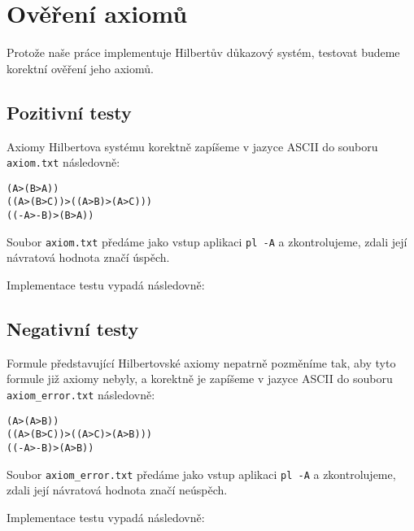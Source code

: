 \documentclass[thesis=B,czech,hidelinks]{FITthesis}[2012/06/26]
\begin{document}
\section{Ověření axiomů}

Protože naše práce implementuje Hilbertův důkazový systém, testovat budeme korektní ověření jeho axiomů.

\subsection{Pozitivní testy}

Axiomy Hilbertova systému korektně zapíšeme v jazyce ASCII do souboru \texttt{axiom.txt} následovně:

\begin{verbatim}
(A>(B>A))
((A>(B>C))>((A>B)>(A>C)))
((-A>-B)>(B>A))
\end{verbatim}

Soubor \texttt{axiom.txt} předáme jako vstup aplikaci \texttt{pl -A} a zkontrolujeme, zdali její návratová hodnota značí úspěch.

Implementace testu vypadá následovně:

\begin{figure}
\centering

\end{figure}

\subsection{Negativní testy}

Formule představující Hilbertovské axiomy nepatrně pozměníme tak, aby tyto formule již axiomy nebyly, a korektně je zapíšeme v jazyce ASCII do souboru \texttt{axiom\_error.txt} následovně:

\begin{verbatim}
(A>(A>B))
((A>(B>C))>((A>C)>(A>B)))
((-A>-B)>(A>B))
\end{verbatim}

Soubor \texttt{axiom\_error.txt} předáme jako vstup aplikaci \texttt{pl -A} a zkontrolujeme, zdali její návratová hodnota značí neúspěch.

Implementace testu vypadá následovně:

\begin{figure}
\centering

\end{figure}
\end{document}
